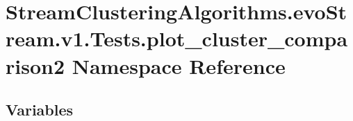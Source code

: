 \hypertarget{namespaceStreamClusteringAlgorithms_1_1evoStream_1_1v1_1_1Tests_1_1plot__cluster__comparison2}{}\section{Stream\+Clustering\+Algorithms.\+evo\+Stream.\+v1.\+Tests.\+plot\+\_\+cluster\+\_\+comparison2 Namespace Reference}
\label{namespaceStreamClusteringAlgorithms_1_1evoStream_1_1v1_1_1Tests_1_1plot__cluster__comparison2}
\subsection*{Variables}
